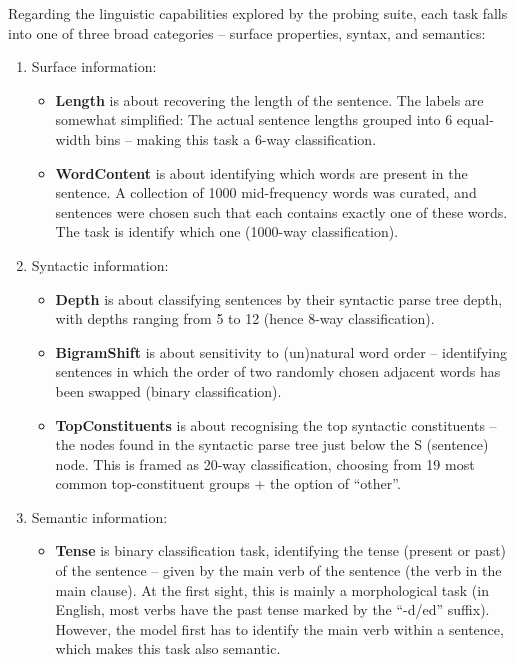 \documentclass[bsc,frontabs,twoside,singlespacing,parskip,deptreport]{infthesis}
\begin{document}
{{    Regarding the linguistic capabilities explored by the probing suite, each task falls into one of three broad categories -- surface properties, syntax, and semantics:
    \begin{enumerate}
      \item {Surface information:
        \begin{itemize}
          \item \textbf{Length} is about recovering the length of the sentence. The labels are somewhat simplified: The actual sentence lengths grouped into 6 equal-width bins -- making this task a 6-way classification.
          \item \textbf{WordContent} is about identifying which words are present in the sentence. A collection of 1000 mid-frequency words was curated, and sentences were chosen such that each contains exactly one of these words. The task is identify which one (1000-way classification).
        \end{itemize}
      }
      \item{Syntactic information:
        \begin{itemize}
          \item \textbf{Depth} is about classifying sentences by their syntactic parse tree depth, with depths ranging from 5 to 12 (hence 8-way classification).
          \item \textbf{BigramShift} is about sensitivity to (un)natural word order -- identifying sentences in which the order of two randomly chosen adjacent words has been swapped (binary classification).
          \item \textbf{TopConstituents} is about recognising the top syntactic constituents -- the nodes found in the syntactic parse tree just below the S (sentence) node. This is framed as 20-way classification, choosing from 19 most common top-constituent groups + the option of ``other''.
        \end{itemize}
      }
      \item{Semantic information:
        \begin{itemize}
          \item \textbf{Tense} is binary classification task, identifying the tense (present or past) of the sentence -- given by the main verb of the sentence (the verb in the main clause). At the first sight, this is mainly a morphological task (in English, most verbs have the past tense marked by the ``-d/ed'' suffix). However, the model first has to identify the main verb within a sentence, which makes this task also semantic.

\end{itemize}}
\end{enumerate}}}
\end{document}

